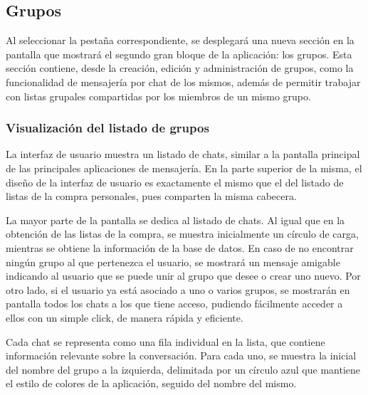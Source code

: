 \documentclass{article}
\begin{document}
\subsection{Grupos}

Al seleccionar la pestaña correspondiente, se desplegará una nueva sección en la pantalla que mostrará el segundo gran bloque de la aplicación: los grupos. Esta sección contiene, desde la creación, edición y administración de grupos, como la funcionalidad de mensajería por chat de los mismos, además de permitir trabajar con listas grupales compartidas por los miembros de un mismo grupo.

\subsubsection{Visualización del listado de grupos}

La interfaz de usuario muestra un listado de chats, similar a la pantalla principal de las principales aplicaciones de mensajería. En la parte superior de la misma, el diseño de la interfaz de usuario es exactamente el mismo que el del listado de listas de la compra personales, pues comparten la misma cabecera.

La mayor parte de la pantalla se dedica al listado de chats. Al igual que en la obtención de las listas de la compra, se muestra inicialmente un círculo de carga, mientras se obtiene la información de la base de datos. En caso de no encontrar ningún grupo al que pertenezca el usuario, se mostrará un mensaje amigable indicando al usuario que se puede unir al grupo que desee o crear uno nuevo.  Por otro lado, si el usuario ya está asociado a uno o varios grupos, se mostrarán en pantalla todos los chats a los que tiene acceso, pudiendo fácilmente acceder a ellos con un simple click, de manera rápida y eficiente.

\newpage

Cada chat se representa como una fila individual en la lista, que contiene información relevante sobre la conversación. Para cada uno, se muestra la inicial del nombre del grupo a la izquierda, delimitada por un círculo azul que mantiene el estilo de colores de la aplicación, seguido del nombre del mismo.
\end{document}
